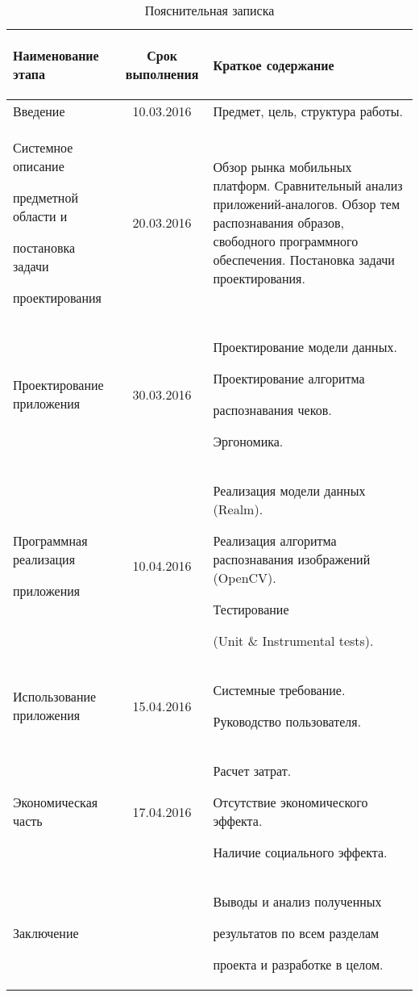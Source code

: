 \begin{table} [h!]
  \caption{
    Пояснительная записка
  }\label{tbl:plan_synopsis}
  \small{
    \begin{tabular}{| m{4.8cm} | c | m{7cm} |}
      \hline
      \begin{center} Наименование этапа \end{center}
      & Срок выполнения
      & \begin{center} Краткое содержание \end{center} \\
      \hline

      Введение
      & 10.03.2016
      & Предмет, цель, структура работы. \\
      \hline

      Системное описание \par
      предметной области и \par
      постановка задачи \par
      проектирования
      & 20.03.2016
      & Обзор рынка мобильных платформ.
        Сравнительный анализ приложений-аналогов.
        Обзор тем распознавания образов,
        свободного программного обеспечения.
        Постановка задачи проектирования. \\
      \hline

      Проектирование приложения
      & 30.03.2016
      & Проектирование модели данных. \par
        Проектирование алгоритма \par
        распознавания чеков. \par
        Эргономика. \\
      \hline

      Программная реализация \par приложения
      & 10.04.2016
      & Реализация модели данных (Realm). \par
        Реализация алгоритма распознавания изображений (OpenCV). \par
        Тестирование \par
        (Unit \& Instrumental tests). \\
      \hline

      Использование приложения
      & 15.04.2016
      & Системные требование. \par
        Руководство пользователя. \\
      \hline

      Экономическая часть
      & 17.04.2016
      & Расчет затрат. \par
        Отсутствие экономического эффекта. \par
        Наличие социального эффекта. \\
      \hline

      Заключение
      &
      & Выводы и анализ полученных \par
        результатов по всем разделам \par
        проекта и разработке в целом. \\
      \hline
    \end{tabular}
  }
\end{table}

